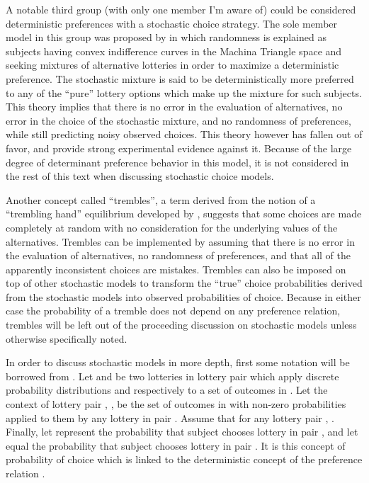 \documentclass[../main.tex]{subfiles}
\begin{document}
A notable third group (with only one member I'm aware of) could be considered deterministic preferences with a stochastic choice strategy.
The sole member model in this group was proposed by \textcite{Machina1985} in which randomness is explained as subjects having convex indifference curves in the Machina Triangle space \textcite{Machina1987} and seeking mixtures of alternative lotteries in order to maximize a deterministic preference.
The stochastic mixture is said to be deterministically more preferred to any of the \enquote{pure} lottery options which make up the mixture for such subjects.
This theory implies that there is no error in the evaluation of alternatives, no error in the choice of the stochastic mixture, and no randomness of preferences, while still predicting noisy observed choices.
This theory however has fallen out of favor, and \textcite{Hey1995} provide strong experimental evidence against it.
Because of the large degree of determinant preference behavior in this model, it is not considered in the rest of this text when discussing stochastic choice models.

Another concept called \enquote{trembles}, a term derived from the notion of a \enquote{trembling hand} equilibrium developed by \textcite{Selten1975}, suggests that some choices are made completely at random with no consideration for the underlying values of the alternatives.
Trembles can be implemented by assuming that there is no error in the evaluation of alternatives, no randomness of preferences, and that all of the apparently inconsistent choices are mistakes.
Trembles can also be imposed on top of other stochastic models to transform the \enquote{true} choice probabilities derived from the stochastic models into observed probabilities of choice.
Because in either case the probability of a tremble does not depend on any preference relation, trembles will be left out of the proceeding discussion on stochastic models unless otherwise specifically noted.

In order to discuss stochastic models in more depth, first some notation will be borrowed from \textcite{Wilcox2008}.
Let  and  be two lotteries in lottery pair  which apply discrete probability distributions  and  respectively to a set of  outcomes in .
Let the context of lottery pair , , be the set of outcomes in  with non-zero probabilities applied to them by any lottery in pair .
Assume that for any lottery pair , .
Finally, let  represent the probability that subject  chooses lottery  in pair , and let  equal the probability that subject  chooses lottery  in pair .
It is this concept of probability of choice which is linked to the deterministic concept of the preference relation .
\end{document}
